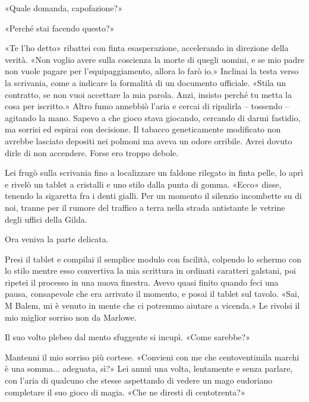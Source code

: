 «Quale domanda, capofazione?»

«Perché stai facendo questo?»

«Te l'ho detto» ribattei con finta esasperazione, accelerando in
direzione della verità. «Non voglio avere sulla coscienza la morte di
quegli uomini, e se mio padre non vuole pagare per l'equipaggiamento,
allora lo farò io.» Inclinai la testa verso la scrivania, come a
indicare la formalità di un documento ufficiale. «Stila un contratto, se
non vuoi accettare la mia parola. Anzi, insisto perché tu metta la cosa
per iscritto.» Altro fumo annebbiò l'aria e cercai di ripulirla --
tossendo -- agitando la mano. Sapevo a che gioco stava giocando,
cercando di darmi fastidio, ma sorrisi ed espirai con decisione. Il
tabacco geneticamente modificato non avrebbe lasciato depositi nei
polmoni ma aveva un odore orribile. Avrei dovuto dirle di non accendere.
Forse ero troppo debole.

Lei frugò sulla scrivania fino a localizzare un faldone rilegato in
finta pelle, lo aprì e rivelò un tablet a cristalli e uno stilo dalla
punta di gomma. «Ecco» disse, tenendo la sigaretta fra i denti gialli.
Per un momento il silenzio incombette su di noi, tranne per il rumore
del traffico a terra nella strada antistante le vetrine degli uffici
della Gilda.

Ora veniva la parte delicata.

Presi il tablet e compilai il semplice modulo con facilità, colpendo lo
schermo con lo stilo mentre esso convertiva la mia scrittura in ordinati
caratteri galstani, poi ripetei il processo in una nuova finestra. Avevo
quasi finito quando feci una pausa, consapevole che era arrivato il
momento, e posai il tablet sul tavolo. «Sai, M Balem, mi è venuto in
mente che ci potremmo aiutare a vicenda.» Le rivolsi il mio miglior
sorriso non da Marlowe.

Il suo volto plebeo dal mento sfuggente si incupì. «Come sarebbe?»

Mantenni il mio sorriso più cortese. «Convieni con me che centoventimila
marchi è una somma... adeguata, sì?» Lei annuì una volta, lentamente e
senza parlare, con l'aria di qualcuno che stesse aspettando di vedere un
mago eudoriano completare il suo gioco di magia. «Che ne diresti di
centotrenta?»

